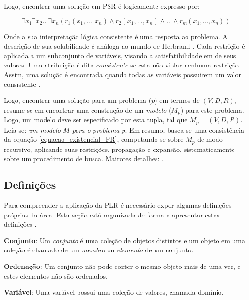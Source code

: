 Logo, encontrar uma soluç\~ao em PSR é logicamente expresso por:

\begin{equation}
\exists x_1 \exists x_2 ... \exists x_n (r_1(x_1, ... , x_n) \wedge r_2(x_1, ... , x_n) \wedge ... \wedge r_m(x_1, ... , x_n) )  
\label{equacao_existencial_PR}
\end{equation}

Onde a sua interpretação lógica consistente é uma resposta ao problema. A descrição
de sua solubilidade é análoga ao mundo de Herbrand \cite{chang-lee73, nilsson00}.  Cada restrição é aplicada a um subconjunto de variáveis, visando a satisfatibilidade em de  seus valores. Uma atribuição é dita \textit{consistente} se esta não violar nenhuma restrição. Assim,  uma solução é encontrada quando todas as variáveis possuirem um valor consistente \cite{RusNorv2010}.



Logo, encontrar uma solução para um problema ($p$) em termos de $(V, D, R)$, resume-se em encontrar uma construção
de um {\em modelo} ($M_p$) para este problema. Logo, 
um modelo deve ser especificado por esta tupla, tal que  
$M_p = (V, D, R)$. Leia-se: {\em um modelo {\bf $M$} para o problema {\bf $p$}}.
Em resumo, busca-se uma consistência da equação \ref{equacao_existencial_PR}, 
computando-se sobre $M_p$ de modo
recursivo,  aplicando suas  restrições, propagação e expansão, sistematicamente sobre um procedimento de busca. Mairores detalhes:  \cite{apt_2003}.


\subsection{Definições} %
\label{subsec_def}


Para compreender a aplicação da PLR é necessário expor algumas definições próprias da área. Esta seção está organizada de forma a apresentar estas definições  \cite{rina2003}.


\textbf{Conjunto}: Um \textit{conjunto} é uma coleção de objetos distintos e um objeto em uma coleção é chamado de um \textit{membro} ou \textit{elemento} de um conjunto.

\textbf{Ordenação}: Um conjunto não pode conter o mesmo objeto mais de uma vez, e estes elementos não são ordenados.

\textbf{Variável}: Uma variável possui uma coleção de valores, chamada domínio.

